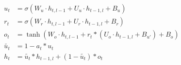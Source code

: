 \documentclass{article}
\begin{document}
\begin{align*}
    u_{t} &= \sigma(W_{u} \cdot h_{t,l-1} + U_{u} \cdot h_{t-1,l} + B_{u}) \\
	r_{t} &= \sigma(W_{r} \cdot h_{t,l-1} + U_{r} \cdot h_{t-1,l} + B_{r}) \\
	o_{t} &= \tanh(W_{o} \cdot h_{t,l-1} + r_{t} * (U_{o} \cdot h_{t-1,l} + B_{u'}) + B_{o}) \\
	\tilde{u_{t}} &= 1 - a_{t} * u_{t} \\
	h_{t} &= \tilde{u_{t}} * h_{t-1,l} + (1-\tilde{u_{t}})*o_{t}
\end{align*}
\end{document}
